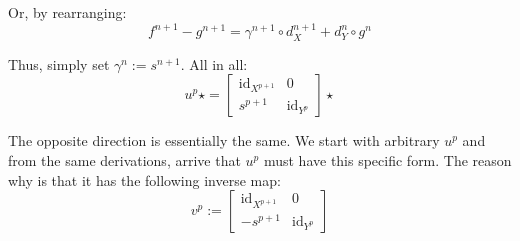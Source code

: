 \documentclass{category-template}
\begin{document}
Or, by rearranging:
\begin{equation*}
    f^{n+1}-g^{n+1} = \gamma^{n+1} \circ d_X^{n+1} + d_Y^n \circ g^{n}
\end{equation*}

Thus, simply set $\gamma^n := s^{n+1}$. All in all:
\begin{equation*}
    u^p \star = \begin{bmatrix}
        \text{id}_{X^{p+1}} & 0 \\
        s^{p+1} & \text{id}_{Y^{p}}
    \end{bmatrix}\star
\end{equation*}

The opposite direction is essentially the same. We start with arbitrary $u^p$
and from the same derivations, arrive that $u^p$ must have this specific form. 
The reason why is that it has the following inverse map:
\begin{equation*}
    v^p := \begin{bmatrix}
        \text{id}_{X^{p+1}} & 0 \\
        -s^{p+1} & \text{id}_{Y^p}
    \end{bmatrix}
\end{equation*}
\end{document}
